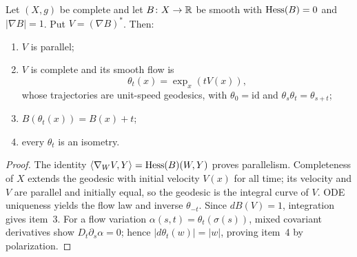 \begin{lemma}
\label{lem:parallel-gradient-flow}



Let $(X,g)$ be complete and let $B\colon X\to\mathbb{R}$ be smooth with
$\operatorname{Hess}(B)=0$ and $|\nabla B|=1$. Put $V=(\nabla B)^*$. Then:
\begin{enumerate}
\item $V$ is parallel;
\item $V$ is complete and its smooth flow is
$$\theta_t(x)=\exp_x(tV(x)),$$
whose trajectories are unit-speed geodesics, with
$\theta_0=\mathrm{id}$ and $\theta_s\theta_t=\theta_{s+t}$;
\item $B(\theta_t(x))=B(x)+t$;
\item every $\theta_t$ is an isometry.
\end{enumerate}
\end{lemma}
\begin{proof}
\sketch
{}
The identity
$\langle\nabla_WV,Y\rangle=\operatorname{Hess}(B)(W,Y)$ proves parallelism.
Completeness of $X$ extends the geodesic with initial velocity $V(x)$
for all time; its velocity and $V$ are parallel and initially equal, so
the geodesic is the integral curve of $V$. ODE uniqueness yields the
flow law and inverse $\theta_{-t}$. Since $dB(V)=1$, integration gives
item~3. For a flow variation $\alpha(s,t)=\theta_t(\sigma(s))$, mixed
covariant derivatives show $D_t\partial_s\alpha=0$; hence
$|d\theta_t(w)|=|w|$, proving item~4 by polarization.
\end{proof}


